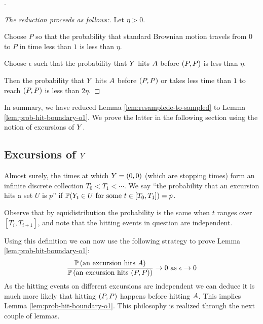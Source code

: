 {\begin{lemma}\label{lem:prob-hit-boundary-o1}
  .
\end{lemma}

\newcommand{\origin}{(0,0)}

\begin{proof}[The reduction proceeds as follows:]
  Let $\eta > 0$.

  Choose $P$ so that the probability that standard Brownian motion
  travels from $0$ to $P$ in time less than $1$ is less than
  $\eta$.

  Choose $\epsilon$ such that the probability that $Y$ hits
  $A$ before $(P,P)$ is less than $\eta$.

  Then the probability that $Y$ hits $A$ before $(P,P)$
  or takes less time than $1$ to reach $(P,P)$ is
  less than $2\eta$.
\end{proof}

In summary, we have reduced Lemma \ref{lem:resamplede-to-sampled} to
Lemma \ref{lem:prob-hit-boundary-o1}. We prove the latter in the
following section using the notion of excursions of $Y$.

\subsection{Excursions of $Y$}

\newcommand{\excursionstart}{T}
{
  Almost surely, the times at which $\twodim = \origin$ (which are stopping
  times) form an infinite discrete collection $\excursionstart_0 <
  \excursionstart_1 < \cdots$. We say ``the probability that an excursion
  hits a set $U$ is $p$'' if $\P(\twodim_t\in U \text{
  for some } t\in [\excursionstart_0, \excursionstart_{1}]) = p$.

  Observe that by equidistribution the probability is the same when
  $t$ ranges over $[\excursionstart_i, \excursionstart_{i+1}]$, and
  note that the hitting events in question are independent.
}

\newcommand{\probexcursionhits}[1]{\P\left(\text{an excursion hits } #1\right)}

Using this definition we can now use the following strategy to
prove Lemma \ref{lem:prob-hit-boundary-o1}:
\[
\frac{\probexcursionhits{\boundarylines}}
     {\probexcursionhits{\farpoint}}
        \to 0 \text{ as } \epsilon\to0
\]
As the hitting events on different excursions are independent we
can deduce it is much more likely that hitting $(P,P)$ happens
before hitting $A$. This implies Lemma
\ref{lem:prob-hit-boundary-o1}. This philosophy is
realized through the next couple of lemmas.

}
